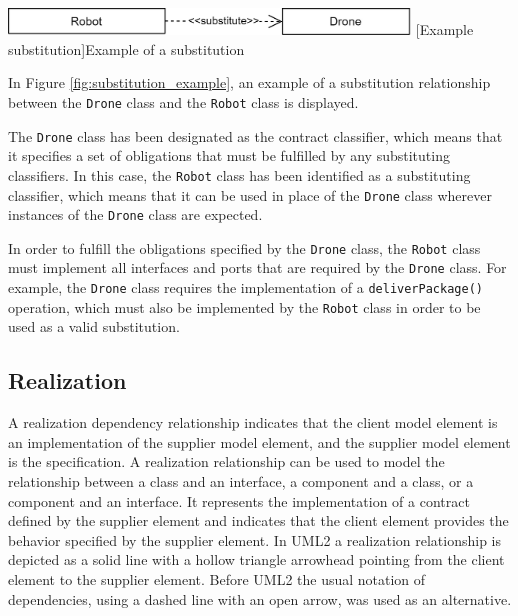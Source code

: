 \documentclass[
	12pt,
    a4paper,
    egregdoesnotlikesansseriftitles, %
    toc=chapterentrywithdots,
    oneside, openany,
    titlepage,
    parskip=half,
    headings=normal,  %
    listof=totoc,
    bibliography=totoc,
    index=totoc,
    captions=tableheading,  %
    listof=flat,
    numbers=noenddot, %
    final]
    {scrbook}
\begin{document}
\vspace{1em}
\begin{minipage}{\linewidth}
	\centering
	\includegraphics[width=0.8\textwidth]{figures/dependencies/substitute.jpg}
	[Example substitution]{Example of a substitution}
	\label{fig:substitution_example}
\end{minipage}
\vspace{1em}


In Figure \ref{fig:substitution_example}, an example of a substitution relationship between the \texttt{Drone} class and the \texttt{Robot} class is displayed.

The \texttt{Drone} class has been designated as the contract classifier, which means that it specifies a set of obligations that must be fulfilled by any substituting classifiers. In this case, the \texttt{Robot} class has been identified as a substituting classifier, which means that it can be used in place of the \texttt{Drone} class wherever instances of the \texttt{Drone} class are expected.

In order to fulfill the obligations specified by the \texttt{Drone} class, the \texttt{Robot} class must implement all interfaces and ports that are required by the \texttt{Drone} class. For example, the \texttt{Drone} class requires the implementation of a \texttt{deliverPackage()} operation, which must also be implemented by the \texttt{Robot} class in order to be used as a valid substitution.


\subsection{Realization}
A realization dependency relationship indicates that the client model element is an implementation of the supplier model element, and the supplier model element is the specification.
A realization relationship can be used to model the relationship between a class and an interface, a component and a class, or a component and an interface. 
It represents the implementation of a contract defined by the supplier element and indicates that the client element provides the behavior specified by the supplier element.
In UML2 a realization relationship is depicted as a solid line with a hollow triangle arrowhead pointing from the client element to the supplier element.
Before UML2 the usual notation of dependencies, using a dashed line with an open arrow, was used as an alternative. \cite[p. 164]{uml}
\end{document}
